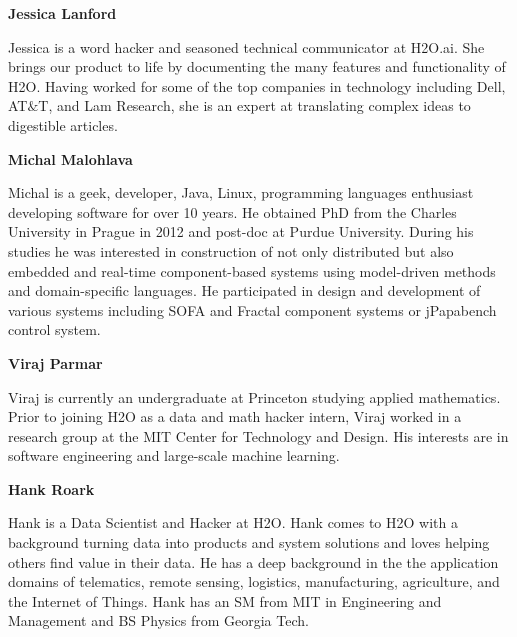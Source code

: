 \textbf{Jessica Lanford}

Jessica is a word hacker and seasoned technical communicator at H2O.ai. She brings our product to life by documenting the many features and functionality of H2O. Having worked for some of the top companies in technology including Dell, AT$\&$T, and Lam Research, she is an expert at translating complex ideas to digestible articles.

\textbf{Michal Malohlava}

Michal is a geek, developer, Java, Linux, programming languages enthusiast developing software for over 10 years. He obtained PhD from the Charles University in Prague in 2012 and post-doc at Purdue University. During his studies he was interested in construction of not only distributed but also embedded and real-time component-based systems using model-driven methods and domain-specific languages. He participated in design and development of various systems including SOFA and Fractal component systems or jPapabench control system.

\textbf{Viraj Parmar}

Viraj is currently an undergraduate at Princeton studying applied mathematics. Prior to joining H2O as a data and math hacker intern, Viraj worked in a research group at the MIT Center for Technology and Design. His interests are in software engineering and large-scale machine learning. 

\textbf{Hank Roark}

Hank is a Data Scientist and Hacker at H2O. Hank comes to H2O with a background turning data into products and system solutions and loves helping others find value in their data. He has a deep background in the the application domains of telematics, remote sensing, logistics, manufacturing, agriculture, and the Internet of Things. Hank has an SM from MIT in Engineering and Management and BS Physics from Georgia Tech.


